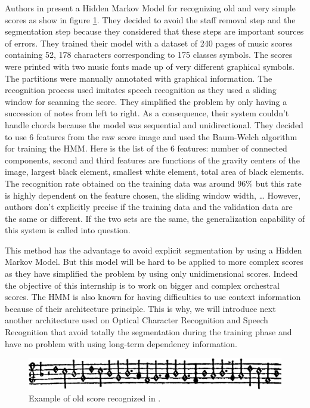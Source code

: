 \documentclass[11pt]{sdm}
\begin{document}
Authors in \cite{pugin_optical_2006} present a Hidden Markov Model for recognizing old and very simple scores as show in figure \ref{old_score_HMM}.
They decided to avoid the staff removal step and the segmentation step because they considered that these steps are important sources of errors.
They trained their model with a dataset of 240 pages of music scores containing 52, 178 characters corresponding to 175 classes symbols.
The scores were printed with two music fonts made up of very different graphical symbols.
The partitions were manually annotated with graphical information.
The recognition process used imitates speech recognition as they used a sliding window for scanning the score.
They simplified the problem by only having a succession of notes from left to right.
As a consequence, their system couldn't handle chords because the model was sequential and unidirectional.
They decided to use 6 features from the raw score image and used the Baum-Welch algorithm for training the HMM.
Here is the list of the 6 features: number of connected components, second and third features are functions of the gravity centers of the image, largest black element, smallest white element, total area of black elements.
The recognition rate obtained on the training data was around 96\% but this rate is highly dependent on the feature chosen, the sliding window width, \ldots
However, authors don't explicitly precise if the training data and the validation data are the same or different.
If the two sets are the same, the generalization capability of this system is called into question.

This method has the advantage to avoid explicit segmentation by using a Hidden Markov Model.
But this model will be hard to be applied to more complex scores as they have simplified the problem by using only unidimensional scores.
Indeed the objective of this internship is to work on bigger and complex orchestral scores.
The HMM is also known for having difficulties to use context information because of their architecture principle.
This is why, we will introduce next another architecture used on Optical Character Recognition and Speech Recognition that avoid totally the segmentation during the training phase and have no problem with using long-term dependency information.
\begin{figure}[btp]
  \centering
  \includegraphics[scale=0.10]{img/old_score_HMM}
  \caption{\label{old_score_HMM} Example of old score recognized in \cite{pugin_optical_2006}. }
\end{figure}
\end{document}
